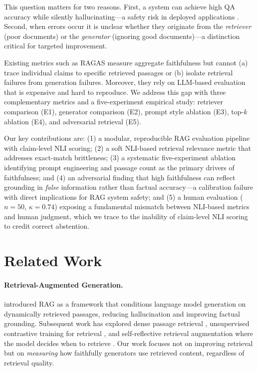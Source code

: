 \documentclass[11pt]{article}
\begin{document}
This question matters for two reasons.
First, a system can achieve high QA accuracy while silently
hallucinating---a safety risk in deployed applications \cite{ji2023survey}.
Second, when errors occur it is unclear whether they originate from
the \emph{retriever} (poor documents) or the \emph{generator} (ignoring
good documents)---a distinction critical for targeted improvement.

Existing metrics such as RAGAS \cite{es-etal-2024-ragas} measure aggregate
faithfulness but cannot (a) trace individual claims to specific retrieved
passages or (b) isolate retrieval failures from generation failures.
Moreover, they rely on LLM-based evaluation that is expensive and
hard to reproduce.
We address this gap with three complementary metrics and a five-experiment
empirical study:
retriever comparison (E1), generator comparison (E2),
prompt style ablation (E3), top-$k$ ablation (E4),
and adversarial retrieval (E5).

Our key contributions are:
(1) a modular, reproducible RAG evaluation pipeline with claim-level NLI
scoring;
(2) a soft NLI-based retrieval relevance metric that addresses
exact-match brittleness;
(3) a systematic five-experiment ablation identifying prompt engineering
and passage count as the primary drivers of faithfulness; and
(4) an adversarial finding that high faithfulness can reflect grounding in
\emph{false} information rather than factual accuracy---a calibration
failure with direct implications for RAG system safety; and
(5) a human evaluation ($n{=}50$, $\kappa{=}0.74$) exposing a fundamental
mismatch between NLI-based metrics and human judgment, which we trace to
the inability of claim-level NLI scoring to credit correct abstention.

\section{Related Work}

\paragraph{Retrieval-Augmented Generation.}
\citet{NEURIPS2020_6b493230} introduced RAG as a framework that conditions
language model generation on dynamically retrieved passages, reducing
hallucination and improving factual grounding.
Subsequent work has explored dense passage retrieval
\cite{karpukhin-etal-2020-dense}, unsupervised contrastive training for
retrieval \cite{izacard2021unsupervised}, and self-reflective retrieval
augmentation where the model decides when to retrieve
\cite{asai2023selfrag}.
Our work focuses not on improving retrieval but on \emph{measuring} how
faithfully generators use retrieved content, regardless of retrieval
quality.
\end{document}
